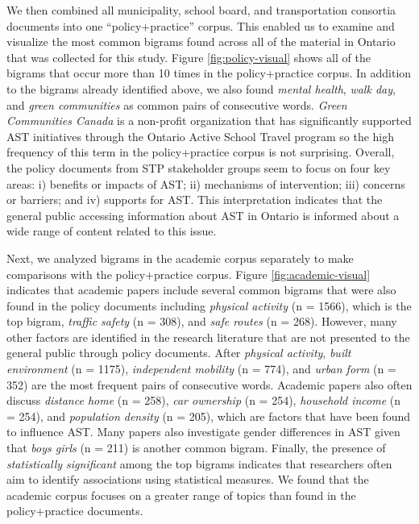 \documentclass[]{elsarticle} %
\begin{document}
We then combined all municipality, school board, and transportation
consortia documents into one ``policy+practice'' corpus. This enabled us
to examine and visualize the most common bigrams found across all of the
material in Ontario that was collected for this study. Figure
\ref{fig:policy-visual} shows all of the bigrams that occur more than 10
times in the policy+practice corpus. In addition to the bigrams already
identified above, we also found \emph{mental health}, \emph{walk day},
and \emph{green communities} as common pairs of consecutive words.
\emph{Green Communities Canada} is a non-profit organization that has
significantly supported AST initiatives through the Ontario Active
School Travel program so the high frequency of this term in the
policy+practice corpus is not surprising. Overall, the policy documents
from STP stakeholder groups seem to focus on four key areas: i) benefits
or impacts of AST; ii) mechanisms of intervention; iii) concerns or
barriers; and iv) supports for AST. This interpretation indicates that
the general public accessing information about AST in Ontario is
informed about a wide range of content related to this issue.

Next, we analyzed bigrams in the academic corpus separately to make
comparisons with the policy+practice corpus. Figure
\ref{fig:academic-visual} indicates that academic papers include several
common bigrams that were also found in the policy documents including
\emph{physical activity} (n = 1566), which is the top bigram,
\emph{traffic safety} (n = 308), and \emph{safe routes} (n = 268).
However, many other factors are identified in the research literature
that are not presented to the general public through policy documents.
After \emph{physical activity}, \emph{built environment} (n = 1175),
\emph{independent mobility} (n = 774), and \emph{urban form} (n = 352)
are the most frequent pairs of consecutive words. Academic papers also
often discuss \emph{distance home} (n = 258), \emph{car ownership} (n =
254), \emph{household income} (n = 254), and \emph{population density}
(n = 205), which are factors that have been found to influence AST. Many
papers also investigate gender differences in AST given that \emph{boys
girls} (n = 211) is another common bigram. Finally, the presence of
\emph{statistically significant} among the top bigrams indicates that
researchers often aim to identify associations using statistical
measures. We found that the academic corpus focuses on a greater range
of topics than found in the policy+practice documents.
\end{document}
